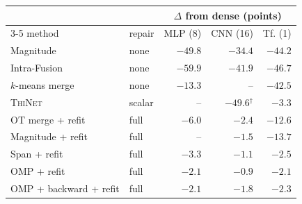 \begin{tabular}{llrrr}
\toprule
& & \multicolumn{3}{c}{$\Delta$ from dense (points)}\\
\cmidrule(lr){3-5}
method & repair & MLP (8) & CNN (16) & Tf. (1)\\
\midrule
Magnitude \citep{li2017pruning} & none & $-49.8$ & $-34.4$ & $-44.2$\\
Intra-Fusion \citep{theus2024intrafusion} & none & $-59.9$ & $-41.9$ & $-46.7$\\
$k$-means merge & none & $-13.3$ & -- & $-42.5$\\
\textsc{ThiNet} \citep{luo2017thinet} & scalar & -- & $-49.6$$^{\dagger}$ & $-3.3$\\
\midrule
OT merge + refit & full & $-6.0$ & $-2.4$ & $-12.6$\\
Magnitude + refit & full & -- & $-1.5$ & $-13.7$\\
Span + refit & full & $-3.3$ & $-1.1$ & $-2.5$\\
OMP + refit & full & \textbf{$-2.1$} & \textbf{$-0.9$} & \textbf{$-2.1$}\\
OMP + backward + refit & full & $-2.1$ & $-1.8$ & $-2.3$\\
\bottomrule
\end{tabular}
